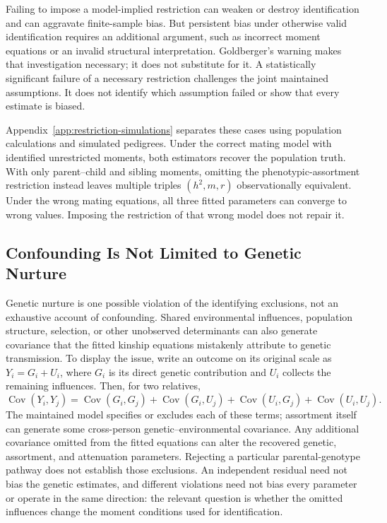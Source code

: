 Failing to impose a model-implied restriction can weaken or destroy
identification and can aggravate finite-sample bias. But persistent bias
under otherwise valid identification requires an additional argument,
such as incorrect moment equations or an invalid structural interpretation.
Goldberger's warning makes that investigation necessary; it does not
substitute for it. A statistically significant failure of a necessary
restriction challenges the joint maintained assumptions. It does not
identify which assumption failed or show that every estimate is biased.

Appendix~\ref{app:restriction-simulations} separates these cases using
population calculations and simulated pedigrees. Under the correct mating
model with identified unrestricted moments, both estimators recover the
population truth. With only parent--child and sibling moments, omitting
the phenotypic-assortment restriction instead leaves multiple triples
$(h^2,m,r)$ observationally equivalent. Under the wrong mating equations,
all three fitted parameters can converge to wrong values. Imposing the
restriction of that wrong model does not repair it.

\subsection{Confounding Is Not Limited to Genetic Nurture}
\label{sec:confounding-beyond-nurture}

Genetic nurture is one possible violation of the identifying exclusions,
not an exhaustive account of confounding. Shared environmental influences,
population structure, selection, or other unobserved determinants can
also generate covariance that the fitted kinship equations mistakenly
attribute to genetic transmission. To display the issue, write an outcome
on its original scale as $Y_i=G_i+U_i$, where $G_i$ is its direct genetic
contribution and $U_i$ collects the remaining influences. Then, for two
relatives,
\[
 \operatorname{Cov}(Y_i,Y_j)=\operatorname{Cov}(G_i,G_j)
 +\operatorname{Cov}(G_i,U_j)+\operatorname{Cov}(U_i,G_j)
 +\operatorname{Cov}(U_i,U_j).
\]
The maintained model specifies or excludes each of these terms; assortment
itself can generate some cross-person genetic--environmental covariance.
Any additional covariance omitted from the fitted equations can alter the
recovered genetic, assortment, and attenuation parameters. Rejecting a
particular parental-genotype pathway does not establish those exclusions.
An independent residual need not bias the genetic estimates, and different
violations need not bias every parameter or operate in the same direction:
the relevant question is whether the omitted influences change the moment
conditions used for identification.

